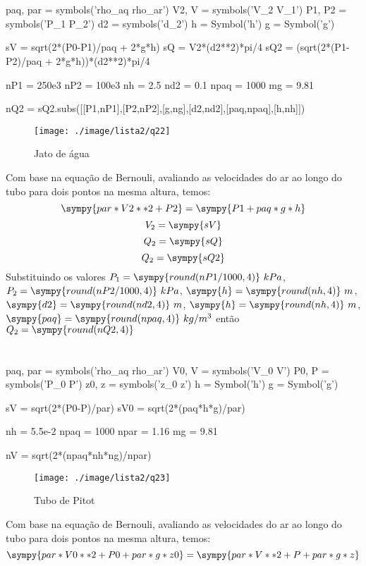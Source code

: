 \documentclass[a4paper,twocolumn,11pt]{article}
\newcommand{\npy}[1]{\sympy{round(n#1,4)}}
\newcommand{\nnpy}[1]{\sympy{#1} = \sympy{round(n#1,4)}}
\begin{document}
\section{} %
\begin{sympycode}
paq, par = symbols('rho_aq rho_ar')
V2, V = symbols('V_2 V_1')
P1, P2 = symbols('P_1 P_2')
d2 = symbols('d_2')
h = Symbol('h')
g = Symbol('g')

sV = sqrt(2*(P0-P1)/paq + 2*g*h)
sQ = V2*(d2**2)*pi/4
sQ2 = (sqrt(2*(P1-P2)/paq + 2*g*h))*(d2**2)*pi/4

nP1 = 250e3
nP2 = 100e3
nh = 2.5
nd2 = 0.1
npaq = 1000
mg = 9.81

nQ2 = sQ2.subs([[P1,nP1],[P2,nP2],[g,ng],[d2,nd2],[paq,npaq],[h,nh]])

\end{sympycode}
\begin{figure}[H]
\centering
\label{fig:l2q22}
\texttt{[image: ./image/lista2/q22]}
\caption{Jato de água}
\end{figure}

Com base na equação de Bernouli, avaliando as velocidades do ar ao longo do tubo para dois pontos na mesma altura, temos:
$$
\sympy{par*V2**2 +P2} = \sympy{P1 + paq*g*h}
$$
$$
V_2 = \sympy{sV}
$$
$$
Q_2 = \sympy{sQ}
$$
$$
Q_2 = \sympy{sQ2}
$$
Substituindo os valores $P_1 = \npy{P1/1000}\ kPa$, $P_2 = \npy{P2/1000}\ kPa$, $\nnpy{h}\ m$, $\nnpy{d2}\ m$, $\nnpy{h}\ m$, $\nnpy{paq}\ kg/m^3$ então $Q_2 = \npy{Q2}$
\section{} %
\begin{sympycode}
paq, par = symbols('rho_aq rho_ar')
V0, V = symbols('V_0 V')
P0, P = symbols('P_0 P')
z0, z = symbols('z_0 z')
h = Symbol('h')
g = Symbol('g')

sV = sqrt(2*(P0-P)/par)
sV0 = sqrt(2*(paq*h*g)/par)

nh = 5.5e-2
npaq = 1000
npar = 1.16
mg = 9.81

nV = sqrt(2*(npaq*nh*ng)/npar)
\end{sympycode}

\begin{figure}[H]
\centering
\label{fig:l2q23}
\texttt{[image: ./image/lista2/q23]}
\caption{Tubo de Pitot}
\end{figure}
Com base na equação de Bernouli, avaliando as velocidades do ar ao longo do tubo para dois pontos na mesma altura, temos:
$$
\sympy{par*V0**2 +P0 + par*g*z0} = \sympy{par*V**2 +P + par*g*z}
$$
\end{document}
